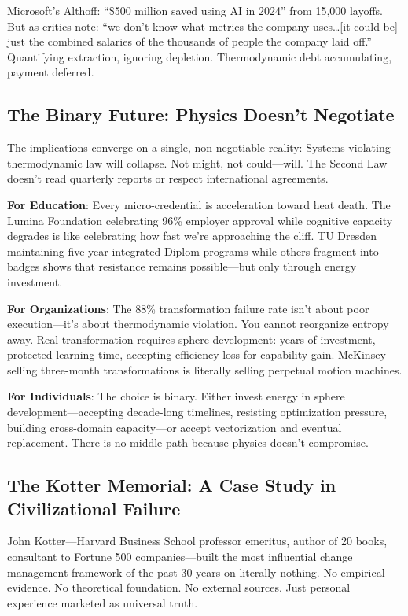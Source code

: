 Microsoft's Althoff: ``\$500 million saved using AI in 2024'' from 15,000 layoffs. But as critics note: ``we don't know what metrics the company uses\ldots [it could be] just the combined salaries of the thousands of people the company laid off.'' Quantifying extraction, ignoring depletion. Thermodynamic debt accumulating, payment deferred.

\subsection{The Binary Future: Physics Doesn't Negotiate}

The implications converge on a single, non-negotiable reality: Systems violating thermodynamic law will collapse. Not might, not could---will. The Second Law doesn't read quarterly reports or respect international agreements.

\textbf{For Education}: Every micro-credential is acceleration toward heat death. The Lumina Foundation celebrating 96\% employer approval while cognitive capacity degrades is like celebrating how fast we're approaching the cliff. TU Dresden maintaining five-year integrated Diplom programs while others fragment into badges shows that resistance remains possible---but only through energy investment.

\textbf{For Organizations}: The 88\% transformation failure rate \citep{bain2024} isn't about poor execution---it's about thermodynamic violation. You cannot reorganize entropy away. Real transformation requires sphere development: years of investment, protected learning time, accepting efficiency loss for capability gain. McKinsey selling three-month transformations is literally selling perpetual motion machines.

\textbf{For Individuals}: The choice is binary. Either invest energy in sphere development---accepting decade-long timelines, resisting optimization pressure, building cross-domain capacity---or accept vectorization and eventual replacement. There is no middle path because physics doesn't compromise.

\subsection{The Kotter Memorial: A Case Study in Civilizational Failure}

John Kotter---Harvard Business School professor emeritus, author of 20 books, consultant to Fortune 500 companies---built the most influential change management framework of the past 30 years on literally nothing. No empirical evidence. No theoretical foundation. No external sources. Just personal experience marketed as universal truth.

